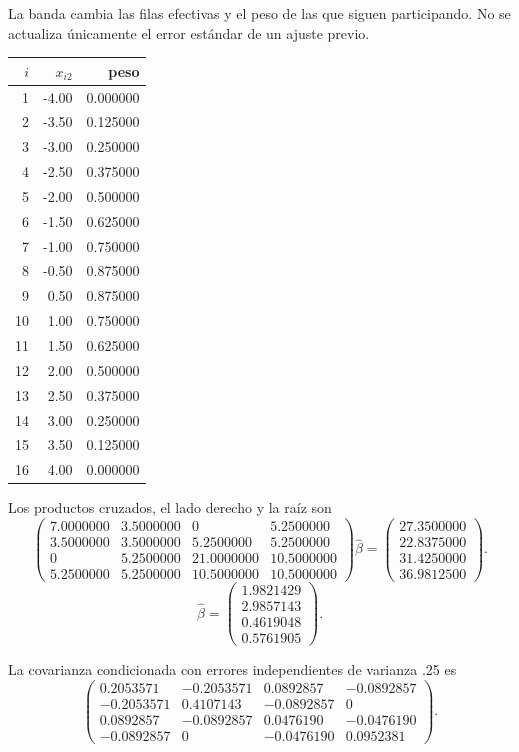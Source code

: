 \documentclass[11pt,a4paper]{article}
\begin{document}
La banda cambia las filas efectivas y
el peso de las que siguen participando.
No se actualiza únicamente el error estándar
de un ajuste previo.
\begin{center}\small\begin{tabular}{rrr}\toprule
\(i\)&\(x_{i2}\)&peso\\\midrule
1&-4.00&0.000000\\
2&-3.50&0.125000\\
3&-3.00&0.250000\\
4&-2.50&0.375000\\
5&-2.00&0.500000\\
6&-1.50&0.625000\\
7&-1.00&0.750000\\
8&-0.50&0.875000\\
9&0.50&0.875000\\
10&1.00&0.750000\\
11&1.50&0.625000\\
12&2.00&0.500000\\
13&2.50&0.375000\\
14&3.00&0.250000\\
15&3.50&0.125000\\
16&4.00&0.000000\\\bottomrule\end{tabular}\end{center}
Los productos cruzados, el lado derecho
y la raíz son
\[
\begin{pmatrix}7.0000000&3.5000000&0&5.2500000\\3.5000000&3.5000000&5.2500000&5.2500000\\0&5.2500000&21.0000000&10.5000000\\5.2500000&5.2500000&10.5000000&10.5000000\end{pmatrix}\widehat\beta=\begin{pmatrix}27.3500000\\22.8375000\\31.4250000\\36.9812500\end{pmatrix}.
\]
\[
\widehat\beta=\begin{pmatrix}1.9821429\\2.9857143\\0.4619048\\0.5761905\end{pmatrix}.
\]

La covarianza condicionada con errores
independientes de varianza .25 es
\[
\begin{pmatrix}0.2053571&-0.2053571&0.0892857&-0.0892857\\-0.2053571&0.4107143&-0.0892857&0\\0.0892857&-0.0892857&0.0476190&-0.0476190\\-0.0892857&0&-0.0476190&0.0952381\end{pmatrix}.
\]
\end{document}
